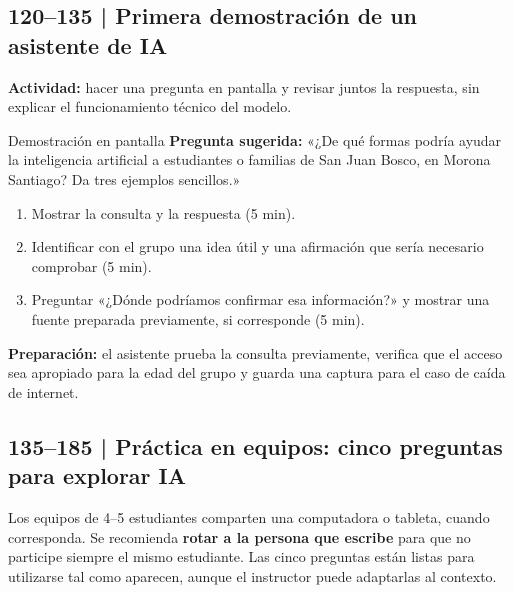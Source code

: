\documentclass[11pt,a4paper]{article}
\begin{document}
\subsection{120--135 | Primera demostración de un asistente de IA}
\textbf{Actividad:} hacer una pregunta en pantalla y revisar juntos la respuesta, sin explicar el funcionamiento técnico del modelo.
\begin{actividad}{Demostración en pantalla}
\textbf{Pregunta sugerida:} «¿De qué formas podría ayudar la inteligencia artificial a estudiantes o familias de San Juan Bosco, en Morona Santiago? Da tres ejemplos sencillos.»
\begin{enumerate}
\item Mostrar la consulta y la respuesta (5 min).
\item Identificar con el grupo una idea útil y una afirmación que sería necesario comprobar (5 min).
\item Preguntar «¿Dónde podríamos confirmar esa información?» y mostrar una fuente preparada previamente, si corresponde (5 min).
\end{enumerate}
\end{actividad}
\textbf{Preparación:} el asistente prueba la consulta previamente, verifica que el acceso sea apropiado para la edad del grupo y guarda una captura para el caso de caída de internet.

\subsection{135--185 | Práctica en equipos: cinco preguntas para explorar IA}
Los equipos de 4--5 estudiantes comparten una computadora o tableta, cuando corresponda. Se recomienda \textbf{rotar a la persona que escribe} para que no participe siempre el mismo estudiante. Las cinco preguntas están listas para utilizarse tal como aparecen, aunque el instructor puede adaptarlas al contexto.
\end{document}

